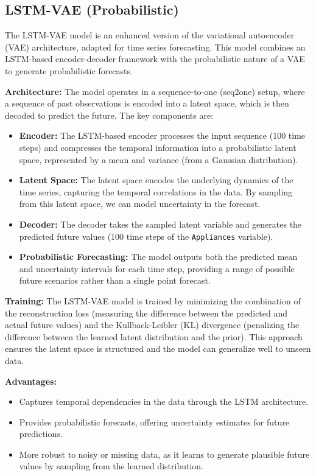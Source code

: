\documentclass{article}
\begin{document}
\subsection{LSTM-VAE (Probabilistic)}
The LSTM-VAE model is an enhanced version of the variational autoencoder (VAE) architecture, adapted for time series forecasting. This model combines an LSTM-based encoder-decoder framework with the probabilistic nature of a VAE to generate probabilistic forecasts.

\textbf{Architecture:}
The model operates in a sequence-to-one (seq2one) setup, where a sequence of past observations is encoded into a latent space, which is then decoded to predict the future. The key components are:

\begin{itemize}
  \item \textbf{Encoder:} The LSTM-based encoder processes the input sequence (100 time steps) and compresses the temporal information into a probabilistic latent space, represented by a mean and variance (from a Gaussian distribution).
  \item \textbf{Latent Space:} The latent space encodes the underlying dynamics of the time series, capturing the temporal correlations in the data. By sampling from this latent space, we can model uncertainty in the forecast.
  \item \textbf{Decoder:} The decoder takes the sampled latent variable and generates the predicted future values (100 time steps of the \texttt{Appliances} variable).
  \item \textbf{Probabilistic Forecasting:} The model outputs both the predicted mean and uncertainty intervals for each time step, providing a range of possible future scenarios rather than a single point forecast.
\end{itemize}

\textbf{Training:}
The LSTM-VAE model is trained by minimizing the combination of the reconstruction loss (measuring the difference between the predicted and actual future values) and the Kullback-Leibler (KL) divergence (penalizing the difference between the learned latent distribution and the prior). This approach ensures the latent space is structured and the model can generalize well to unseen data.

\textbf{Advantages:}
\begin{itemize}
  \item Captures temporal dependencies in the data through the LSTM architecture.
  \item Provides probabilistic forecasts, offering uncertainty estimates for future predictions.
  \item More robust to noisy or missing data, as it learns to generate plausible future values by sampling from the learned distribution.
\end{itemize}
\end{document}
